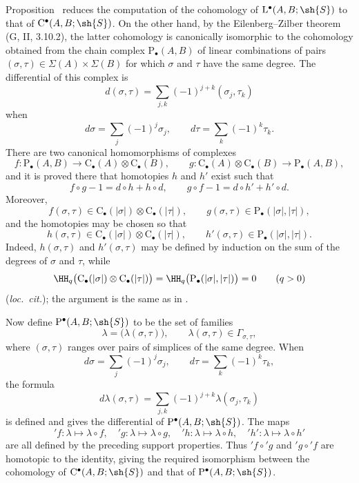 \begin{env}[11.8.6]
\label{0.11.8.6}
Proposition~ reduces the computation of the cohomology of
$\mathrm{L}^\bullet(A,B;\sh{S})$ to that of
$\mathrm{C}^\bullet(A,B;\sh{S})$.
On the other hand, by the Eilenberg--Zilber theorem
(G, II, 3.10.2), the latter cohomology is canonically isomorphic to the
cohomology obtained from the chain complex
$\mathrm{P}_\bullet(A,B)$ of linear combinations of pairs
$(\sigma,\tau)\in\Sigma(A)\times\Sigma(B)$ for which $\sigma$ and
$\tau$ have the same degree.
The differential of this complex is
\[
  d(\sigma,\tau)
  =
  \sum_{j,k}(-1)^{j+k}(\sigma_j,\tau_k)
\]
when
\[
  d\sigma=\sum_j(-1)^j\sigma_j,
  \qquad
  d\tau=\sum_k(-1)^k\tau_k.
\]
There are two canonical homomorphisms of complexes
\[
  f:\mathrm{P}_\bullet(A,B)
  \longrightarrow
  \mathrm{C}_\bullet(A)\otimes\mathrm{C}_\bullet(B),
  \qquad
  g:\mathrm{C}_\bullet(A)\otimes\mathrm{C}_\bullet(B)
  \longrightarrow
  \mathrm{P}_\bullet(A,B),
\]
and it is proved there that homotopies $h$ and $h'$ exist such that
\[
  f\circ g-1=d\circ h+h\circ d,
  \qquad
  g\circ f-1=d\circ h'+h'\circ d.
\]
Moreover,
\[
  f(\sigma,\tau)
  \in
  \mathrm{C}_\bullet(|\sigma|)
  \otimes
  \mathrm{C}_\bullet(|\tau|),
  \qquad
  g(\sigma,\tau)
  \in
  \mathrm{P}_\bullet(|\sigma|,|\tau|),
\]
and the homotopies may be chosen so that
\[
  h(\sigma,\tau)
  \in
  \mathrm{C}_\bullet(|\sigma|)
  \otimes
  \mathrm{C}_\bullet(|\tau|),
  \qquad
  h'(\sigma,\tau)
  \in
  \mathrm{P}_\bullet(|\sigma|,|\tau|).
\]
Indeed, $h(\sigma,\tau)$ and $h'(\sigma,\tau)$ may be defined by
induction on the sum of the degrees of $\sigma$ and $\tau$, while
\[
  \HH_q\bigl(
    \mathrm{C}_\bullet(|\sigma|)
    \otimes
    \mathrm{C}_\bullet(|\tau|)
  \bigr)
  =
  \HH_q\bigl(\mathrm{P}_\bullet(|\sigma|,|\tau|)\bigr)
  =
  0
  \qquad(q>0)
\]
(\emph{loc.\ cit.}); the argument is the same as in
.

Now define $\mathrm{P}^\bullet(A,B;\sh{S})$ to be the set of families
\[
  \lambda=\bigl(\lambda(\sigma,\tau)\bigr),
  \qquad
  \lambda(\sigma,\tau)\in\Gamma_{\sigma,\tau},
\]
where $(\sigma,\tau)$ ranges over pairs of simplices of the same degree.
When
\[
  d\sigma=\sum_j(-1)^j\sigma_j,
  \qquad
  d\tau=\sum_k(-1)^k\tau_k,
\]
the formula
\[
  d\lambda(\sigma,\tau)
  =
  \sum_{j,k}(-1)^{j+k}\lambda(\sigma_j,\tau_k)
\]
is defined and gives the differential of
$\mathrm{P}^\bullet(A,B;\sh{S})$.
The maps
\[
  {}'\!f:\lambda\longmapsto\lambda\circ f,\quad
  {}'\!g:\lambda\longmapsto\lambda\circ g,\quad
  {}'\!h:\lambda\longmapsto\lambda\circ h,\quad
  {}'\!h':\lambda\longmapsto\lambda\circ h'
\]
are all defined by the preceding support properties.
Thus ${}'\!f\circ{}'\!g$ and ${}'\!g\circ{}'\!f$ are homotopic to the
identity, giving the required isomorphism between the cohomology of
$\mathrm{C}^\bullet(A,B;\sh{S})$ and that of
$\mathrm{P}^\bullet(A,B;\sh{S})$.
\end{env}

